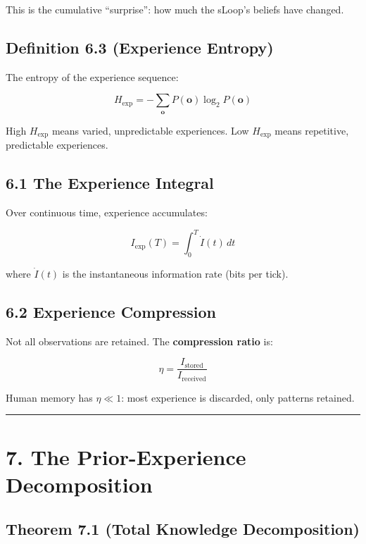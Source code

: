 \documentclass[
  11pt,
  letterpaper,
  twoside,
  openany]{book}
\makeatletter
\let\orig@section\section
\renewcommand{\section}{\needspace{8\baselineskip}\orig@section}
\let\orig@subsection\subsection
\renewcommand{\subsection}{\needspace{6\baselineskip}\orig@subsection}
\makeatother
\begin{document}
This is the cumulative ``surprise'': how much the sLoop's beliefs have
changed.

\subsection{Definition 6.3 (Experience
Entropy)}\label{definition-6.3-experience-entropy}

The entropy of the experience sequence:

\[H_{\text{exp}} = -\sum_{\mathbf{o}} P(\mathbf{o}) \log_2 P(\mathbf{o})\]

High \(H_{\text{exp}}\) means varied, unpredictable experiences. Low
\(H_{\text{exp}}\) means repetitive, predictable experiences.

\subsection{6.1 The Experience Integral}\label{the-experience-integral}

Over continuous time, experience accumulates:

\[I_{\text{exp}}(T) = \int_0^T \dot{I}(t) \, dt\]

where \(\dot{I}(t)\) is the instantaneous information rate (bits per
tick).

\subsection{6.2 Experience Compression}\label{experience-compression}

Not all observations are retained. The \textbf{compression ratio} is:

\[\eta = \frac{I_{\text{stored}}}{I_{\text{received}}}\]

Human memory has \(\eta \ll 1\): most experience is discarded, only
patterns retained.

\begin{center}\rule{0.5\linewidth}{0.5pt}\end{center}

\section{7. The Prior-Experience
Decomposition}\label{the-prior-experience-decomposition}

\subsection{Theorem 7.1 (Total Knowledge
Decomposition)}\label{theorem-7.1-total-knowledge-decomposition}
\end{document}
